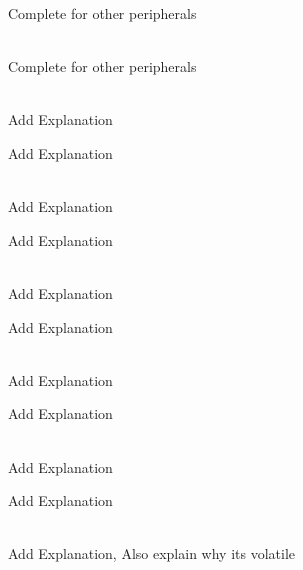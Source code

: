 \begin{DoxyRefList}
\label{todo__todo000074}%
%
Complete for other peripherals  
\item[{\parbox[t]{\linewidth}{Module \doxylink{group___a_p_b2___r_e_s_e_t___m_a_c_r_o_s}{APB2\+\_\+\+RESET\+\_\+\+MACROS} }}]\hfill \\
\label{todo__todo000079}%
%
Complete for other peripherals  
\item[{\parbox[t]{\linewidth}{Member \doxylink{struct_g_p_i_ox___reg_def__t_a7bb86e1aa7bfba5dea71646b1c2fd754}{GPIOx\+\_\+\+Reg\+Def\+\_\+t\+::AFRH} }}]\hfill \\
\label{todo__todo000020}%
%
Add Explanation 

\label{todo__todo000090}%
%
Add Explanation  
\item[{\parbox[t]{\linewidth}{Member \doxylink{struct_g_p_i_ox___reg_def__t_a126fbbca62fb9da89d8784bbdca0d6d1}{GPIOx\+\_\+\+Reg\+Def\+\_\+t\+::AFRL} }}]\hfill \\
\label{todo__todo000019}%
%
Add Explanation 

\label{todo__todo000089}%
%
Add Explanation  
\item[{\parbox[t]{\linewidth}{Member \doxylink{struct_g_p_i_ox___reg_def__t_af84cc0f5fe70f7b86aee081a67b810a2}{GPIOx\+\_\+\+Reg\+Def\+\_\+t\+::BSRR} }}]\hfill \\
\label{todo__todo000017}%
%
Add Explanation 

\label{todo__todo000087}%
%
Add Explanation  
\item[{\parbox[t]{\linewidth}{Member \doxylink{struct_g_p_i_ox___reg_def__t_a6e89a0ca7efb4878fed5adafca726873}{GPIOx\+\_\+\+Reg\+Def\+\_\+t\+::IDR} }}]\hfill \\
\label{todo__todo000015}%
%
Add Explanation 

\label{todo__todo000085}%
%
Add Explanation  
\item[{\parbox[t]{\linewidth}{Member \doxylink{struct_g_p_i_ox___reg_def__t_a1a673ed7c22b58995a083291e0e19bff}{GPIOx\+\_\+\+Reg\+Def\+\_\+t\+::LCKR} }}]\hfill \\
\label{todo__todo000018}%
%
Add Explanation 

\label{todo__todo000088}%
%
Add Explanation  
\item[{\parbox[t]{\linewidth}{Member \doxylink{struct_g_p_i_ox___reg_def__t_a7131c3ab513a84fc69270888ddbe561d}{GPIOx\+\_\+\+Reg\+Def\+\_\+t\+::MODER} }}]\hfill \\
\label{todo__todo000011}%
%
Add Explanation, Also explain why its volatile 


\end{DoxyRefList}
